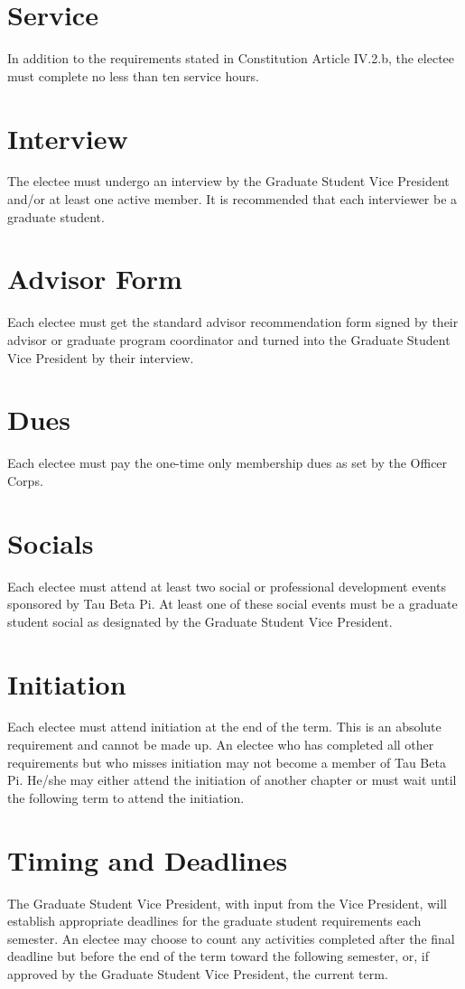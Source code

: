\section{Service}	In addition to the requirements stated in Constitution Article IV.2.b, the electee must complete no less than ten service hours. 
\section{Interview}	The electee must undergo an interview by the Graduate Student Vice President and/or at least one active member. It is recommended that each interviewer be a graduate student. 
\section{Advisor Form}	Each electee must get the standard advisor recommendation form signed by their advisor or graduate program coordinator and turned into the Graduate Student Vice President by their interview.
\section{Dues}	Each electee must pay the one-time only membership dues as set by the Officer Corps. 
\section{Socials}	Each electee must attend at least two social  or professional development events sponsored by Tau Beta Pi.  At least one of these social events must be a graduate student social as designated by the Graduate Student Vice President.
\section{Initiation}	Each electee must attend initiation at the end of the term. This is an absolute requirement and cannot be made up. An electee who has completed all other requirements but who misses initiation may not become a member of Tau Beta Pi. He/she may either attend the initiation of another chapter or must wait until the following term to attend the initiation.  
\section{Timing and Deadlines}  The Graduate Student Vice President, with input from the Vice President, will establish appropriate deadlines for the graduate student requirements each semester. An electee may choose to count any activities completed after the final deadline but before the end of the term toward the following semester, or, if approved by the Graduate Student Vice President, the current term.


